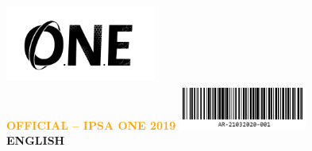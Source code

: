 	
		\pagestyle{pagedegarde}
		\sffamily
		\hfill\includegraphics[height=2.5cm]{media/logooneblack}\\
		\noindent\textbf{\textcolor{orange}{OFFICIAL – IPSA ONE 2019}}\hfill
		\includegraphics[height=1.5cm]{media/codebarre}\\
		\textbf{\textcolor{vertONE}{ENGLISH}} \\
		
		\vspace*{5pt}
		


